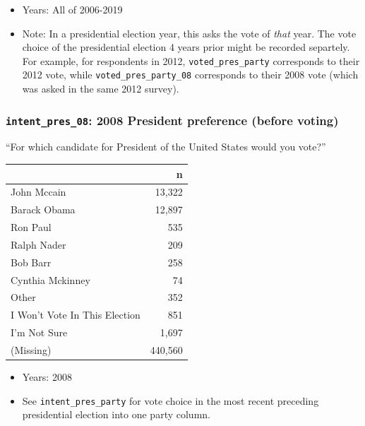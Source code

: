 \documentclass[10pt,article,oneside]{memoir}
\theoremstyle{definition}
\begin{document}
\begin{itemize}
\tightlist
\item
  Years: All of 2006-2019
\item
  Note: In a presidential election year, this asks the vote of
  \emph{that} year. The vote choice of the presidential election 4 years
  prior might be recorded separtely. For example, for respondents in
  2012, \texttt{voted\_pres\_party} corresponds to their 2012 vote,
  while \texttt{voted\_pres\_party\_08} corresponds to their 2008 vote
  (which was asked in the same 2012 survey).
\end{itemize}

\hypertarget{intent_pres_08-2008-president-preference-before-voting}{%
\subsubsection{\texorpdfstring{\texttt{intent\_pres\_08}: 2008 President
preference (before
voting)}{intent\_pres\_08: 2008 President preference (before voting)}}\label{intent_pres_08-2008-president-preference-before-voting}}

``For which candidate for President of the United States would you
vote?''

\begin{table}[H]
\centering
\begin{tabular}{lr}
\toprule
 & n\\
\midrule
John Mccain & 13,322\\
Barack Obama & 12,897\\
Ron Paul & 535\\
Ralph Nader & 209\\
Bob Barr & 258\\
Cynthia Mckinney & 74\\
Other & 352\\
I Won't Vote In This Election & 851\\
I'm Not Sure & 1,697\\
(Missing) & 440,560\\
\bottomrule
\end{tabular}
\end{table}

\begin{itemize}
\tightlist
\item
  Years: 2008
\item
  See \texttt{intent\_pres\_party} for vote choice in the most recent
  preceding presidential election into one party column.
\end{itemize}
\end{document}
